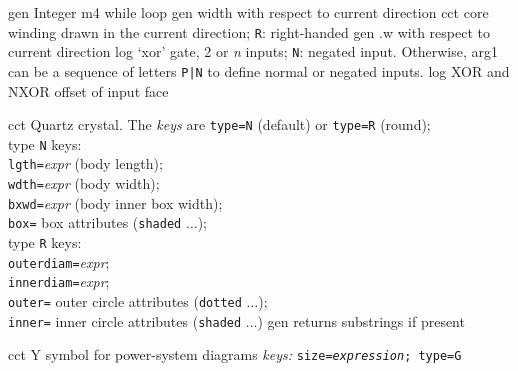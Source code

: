 %

%
  {gen}%
  {Integer m4 while loop}%
%
  {gen}%
  {width with respect to current direction}%
%
  {cct}%
  {core winding drawn in the current direction; {\tt R}: right-handed
   }%
%
  {gen}%
  {.w with respect to current direction}%
%
  {log}%
  {`xor' gate, 2 or {\sl n\/} inputs; {\tt N}: negated input.
   Otherwise, arg1 can be a sequence of letters {\tt P|N} to define
   normal or negated inputs.
    }%
%
  {log}%
  {XOR and NXOR offset of input face}%

%

%
  {cct}%
  {Quartz crystal. The {\sl keys} are
     {\tt type=N} (default) or {\tt type=R} (round);\\
            type {\tt N} keys:\\
              {\tt lgth=}{\sl expr} (body length);\\
              {\tt wdth=}{\sl expr} (body width);\\
              {\tt bxwd=}{\sl expr} (body inner box width);\\
              {\tt box=} box attributes ({\tt shaded} $\ldots$);\\
            type {\tt R} keys:\\
              {\tt outerdiam=}{\sl expr};\\
              {\tt innerdiam=}{\sl expr};\\
              {\tt outer=} outer circle attributes ({\tt dotted} $\ldots$);\\
              {\tt inner=} inner circle attributes ({\tt shaded} $\ldots$)%
}%
%
  {gen}%
  {returns substrings if present}%

%

%
  {cct}%
  {Y symbol for power-system diagrams
   {\sl keys:} {\tt size={\sl expression}; type=G}}%
